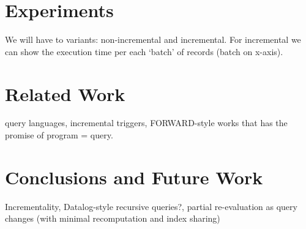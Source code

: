 \documentclass[runningheads]{llncs}
\begin{document}
\section{Experiments}\label{sec:experiments}
We will have to variants: non-incremental and incremental.
For incremental we can show the execution time per each `batch' of
records (batch on x-axis).


\section{Related Work}\label{sec:related_work}
query languages, incremental triggers, FORWARD-style works that has the promise
of program = query.


\section{Conclusions and Future Work}\label{sec:conclusions}
Incrementality, Datalog-style recursive queries?, partial re-evaluation as
query changes (with minimal recomputation and index sharing)
%
%



\end{document}
